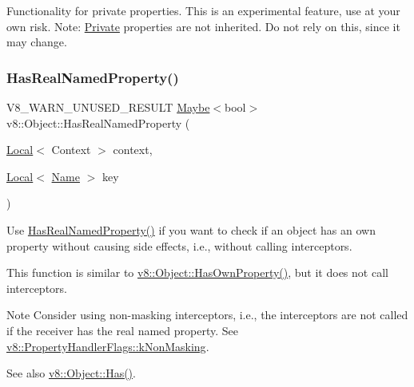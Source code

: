 Functionality for private properties. This is an experimental feature, use at your own risk. Note\+: \mbox{\hyperlink{classv8_1_1Private}{Private}} properties are not inherited. Do not rely on this, since it may change. \mbox{\label{classv8_1_1Object_ad830b937c7586fe2086b288ea79935c4}} 
\subsubsection{\texorpdfstring{Has\+Real\+Named\+Property()}{HasRealNamedProperty()}}
{\footnotesize\ttfamily V8\+\_\+\+W\+A\+R\+N\+\_\+\+U\+N\+U\+S\+E\+D\+\_\+\+R\+E\+S\+U\+LT \mbox{\hyperlink{classv8_1_1Maybe}{Maybe}}$<$bool$>$ v8\+::\+Object\+::\+Has\+Real\+Named\+Property (\begin{DoxyParamCaption}\item[{\mbox{\hyperlink{classv8_1_1Local}{Local}}$<$ Context $>$}]{context,  }\item[{\mbox{\hyperlink{classv8_1_1Local}{Local}}$<$ \mbox{\hyperlink{classv8_1_1Name}{Name}} $>$}]{key }\end{DoxyParamCaption})}

Use \mbox{\hyperlink{classv8_1_1Object_ad830b937c7586fe2086b288ea79935c4}{Has\+Real\+Named\+Property()}} if you want to check if an object has an own property without causing side effects, i.\+e., without calling interceptors.

This function is similar to \mbox{\hyperlink{classv8_1_1Object_acdd3921e95d5bb1a27cea489792607ff}{v8\+::\+Object\+::\+Has\+Own\+Property()}}, but it does not call interceptors.

\begin{DoxyNote}{Note}
Consider using non-\/masking interceptors, i.\+e., the interceptors are not called if the receiver has the real named property. See {\ttfamily \mbox{\hyperlink{namespacev8_af4789f0aeb8680e353901a35810cac1aa8678eef5728c64ca2122dfe336f116aa}{v8\+::\+Property\+Handler\+Flags\+::k\+Non\+Masking}}}.
\end{DoxyNote}
See also \mbox{\hyperlink{classv8_1_1Object_a57d4819c2cc13715ed22dd23cdc84d7c}{v8\+::\+Object\+::\+Has()}}. \mbox{\label{classv8_1_1Object_aaec28576353eebe6fee113bce2718ecc}} 
